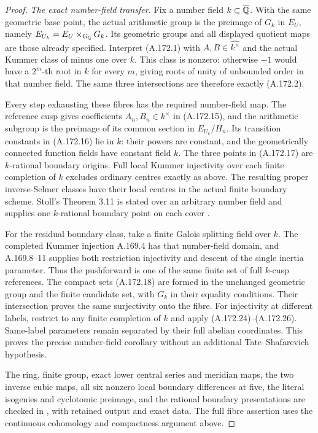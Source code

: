 \begin{proof}
\emph{The exact number-field transfer.}
Fix a number field \(k\subset\overline{\mathbb Q}\).
With the same geometric base point, the actual arithmetic group
is the preimage of \(G_k\) in \(E_U\), namely
\(E_{U_k}=E_U\times_{G_\mathbb Q}G_k\).  Its geometric groups and all
displayed quotient maps are those already specified.  Interpret
(A.172.1) with \(A,B\in\widehat{k^\times}\) and the actual
Kummer class of minus one over \(k\).  This class is nonzero:
otherwise \(-1\) would have a \(2^m\)-th root in \(k\) for
every \(m\), giving roots of unity of unbounded order in that
number field.  The same three intersections are therefore
exactly (A.172.2).

Every step exhausting these fibres has the required number-field
map.  The reference cusp gives coefficients \(A_n,B_n\in k^\times\)
in (A.172.15), and the arithmetic subgroup is the preimage of its
common section in \(E_{U_k}/H_n\).  Its transition constants
in (A.172.16) lie in \(k\): their powers are constant, and the
geometrically connected function fields have constant field \(k\).
The three points in (A.172.17) are \(k\)-rational boundary
origins.  Full local Kummer injectivity over each finite
completion of \(k\) excludes ordinary centres exactly as above.
The resulting proper inverse-Selmer classes have their local
centres in the actual finite boundary scheme.
Stoll's Theorem 3.11 is stated over an arbitrary number field
and supplies one \(k\)-rational boundary point on each cover
\cite[Theorem 3.11]{LegStoll2007}.

For the residual boundary class, take a finite Galois splitting
field over \(k\).  The completed Kummer injection A.169.4 has
that number-field domain, and A.169.8--11 supplies both restriction
injectivity and descent of the single inertia parameter.
Thus the pushforward is one of the same finite set of full
\(k\)-cusp references.  The compact sets (A.172.18) are formed
in the unchanged geometric group and the finite candidate set,
with \(G_k\) in their equality conditions.  Their intersection
proves the same surjectivity onto the fibre.
For injectivity at different labels, restrict to any finite
completion of \(k\) and apply (A.172.24)--(A.172.26).
Same-label parameters remain separated by their full abelian
coordinates.  This proves the precise number-field corollary
without an additional Tate--Shafarevich hypothesis.

The ring, finite group, exact lower central series and meridian
maps, the two inverse cubic maps, all six nonzero local boundary
differences at five, the literal isogenies and cyclotomic preimage,
and the rational boundary presentations are
checked in ,
with retained output and exact data.  The full fibre assertion
uses the continuous cohomology and compactness argument above.
\end{proof}
